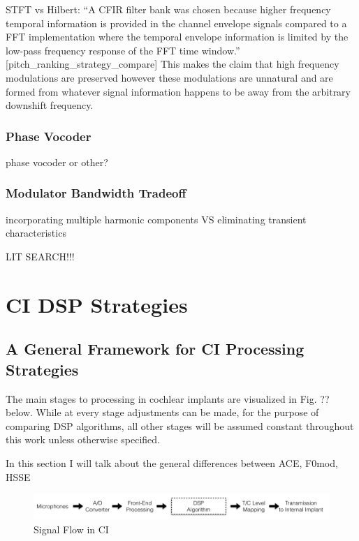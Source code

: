 \documentclass [11pt, proquest] {uwthesis}[2015/03/03]
\begin{document}
STFT vs Hilbert:
``A CFIR filter bank was chosen because higher frequency temporal information is provided in the channel envelope signals compared to a FFT implementation where the temporal envelope information is limited by the low-pass frequency response of the FFT time window.'' [pitch_ranking_strategy_compare]
This makes the claim that high frequency modulations are preserved however these modulations are unnatural and are formed from whatever signal information happens to be away from the arbitrary downshift frequency.

\subsection{Phase Vocoder}

phase vocoder or other?

\subsection{Modulator Bandwidth Tradeoff}

incorporating multiple harmonic components VS eliminating transient characteristics


LIT SEARCH!!!



\chapter{CI DSP Strategies}


\section{A General Framework for CI Processing Strategies}

The main stages to processing in cochlear implants are visualized in Fig. ?? below.  While at every stage adjustments can be made, for the purpose of comparing DSP algorithms, all other stages will be assumed constant throughout this work unless otherwise specified.

In this section I will talk about the general differences between ACE, F0mod, HSSE

\begin{figure}[!ht]
  \centering
    \includegraphics[width=1.0\textwidth]{CI_Signal_FlowTEMP}   
    \caption{Signal Flow in CI}
\end{figure}
\end{document}
